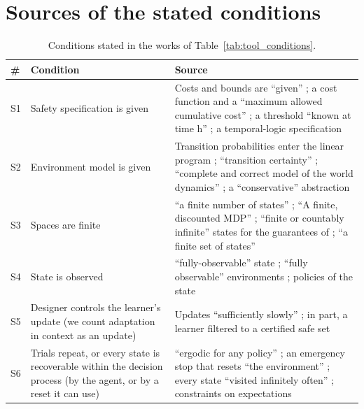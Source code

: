 \documentclass{article}
\begin{document}
\newpage
\appendix
\hypertarget{app:stated}{%
\section{Sources of the stated conditions}\label{app:stated}}

\begin{table}[!htb]
\centering\small\setlength{\tabcolsep}{3pt}
\caption{Conditions stated in the works of Table~\ref{tab:tool_conditions}.}\label{tab:stated}
\begin{tabularx}{\textwidth}{@{}l>{\raggedright\arraybackslash}X>{\raggedright\arraybackslash}X@{}}
\toprule
\# & Condition & Source \\
\midrule
S1 & Safety specification is given & Costs and bounds are ``given'' \citep{altman1999}; a cost function and a ``maximum allowed cumulative cost'' \citep{satija2020}; a threshold ``known at time h'' \citep{wachi2023}; a temporal-logic specification \citep{alshiekh2018} \\
S2 & Environment model is given & Transition probabilities enter the linear program \citep{altman1999}; ``transition certainty'' \citep{mohammedalamen2025a}; ``complete and correct model of the world dynamics'' \citep{kaelbling1998}; a ``conservative'' abstraction \citep{alshiekh2018} \\
S3 & Spaces are finite & ``a finite number of states'' \citep[Part I]{altman1999}; ``A finite, discounted MDP'' \citep{mohammedalamen2025a}; ``finite or countably infinite'' states for the guarantees of \citet{mohammedalamen2025b}; ``a finite set of states'' \citep{kaelbling1998} \\
S4 & State is observed & ``fully-observable'' state \citep{wachi2023}; ``fully observable'' environments \citep{mohammedalamen2025a}; policies of the state \citep{altman1999, satija2020} \\
S5 & Designer controls the learner's update (we count adaptation in context as an update) & Updates ``sufficiently slowly'' \citep{satija2020}; in part, a learner filtered to a certified safe set \citep{wachi2023} \\
S6 & Trials repeat, or every state is recoverable within the decision process (by the agent, or by a reset it can use) & ``ergodic for any policy'' \citep{satija2020}; an emergency stop that resets ``the environment'' \citep{wachi2023}; every state ``visited infinitely often'' \citep{mohammedalamen2025b}; constraints on expectations \citep{altman1999} \\
\bottomrule
\end{tabularx}
\end{table}
\end{document}
